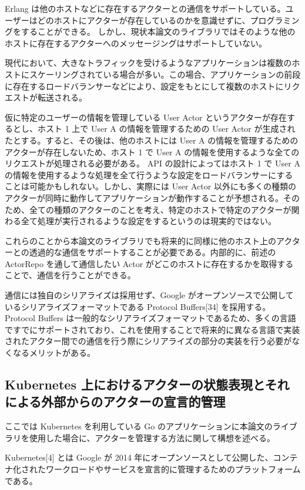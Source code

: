 Erlang
は他のホストなどに存在するアクターとの通信をサポートしている。ユーザーはどのホストにアクターが存在しているのかを意識せずに、プログラミングをすることができる。
しかし、現状本論文のライブラリではそのような他のホストに存在するアクターへのメッセージングはサポートしていない。

現代において、大きなトラフィックを受けるようなアプリケーションは複数のホストにスケーリングされている場合が多い。この場合、アプリケーションの前段に存在するロードバランサーなどにより、設定をもとにして複数のホストにリクエストが転送される。

仮に特定のユーザーの情報を管理している User Actor
というアクターが存在するとし、ホスト 1 上で User A
の情報を管理するための User Actor
が生成されたとする。すると、その後は、他のホストには User A
の情報を管理するためのアクターが存在しないため、ホスト 1 で User A
の情報を使用するような全てのリクエストが処理される必要がある。 API
の設計によってはホスト 1 で User A
の情報を使用するような処理を全て行うような設定をロードバランサーにすることは可能かもしれない。しかし、実際には
User Actor
以外にも多くの種類のアクターが同時に動作してアプリケーションが動作することが予想される。そのため、全ての種類のアクターのことを考え、特定のホストで特定のアクターが関わる全て処理が実行されるような設定をするというのは現実的ではない。

これらのことから本論文のライブラリでも将来的に同様に他のホスト上のアクターとの透過的な通信をサポートすることが必要である。内部的に、前述の
ActorRepo を通して通信したい Actor
がどこのホストに存在するかを取得することで、通信を行うことができる。

通信には独自のシリアライズは採用せず、Google
がオープンソースで公開しているシリアライズフォーマットである Protocol
Buffers{[}34{]} を採用する。Protocol Buffers
は一般的なシリアライズフォーマットであるため、多くの言語ですでにサポートされており、これを使用することで将来的に異なる言語で実装されたアクター間での通信を行う際にシリアライズの部分の実装を行う必要がなくなるメリットがある。

\subsection{Kubernetes 上におけるアクターの状態表現とそれによる外部からのアクターの宣言的管理}

ここでは Kubernetes を利用している Go
のアプリケーションに本論文のライブラリを使用した場合に、アクターを管理する方法に関して構想を述べる。

Kubernetes{[}4{]} とは Google が 2014
年にオープンソースとして公開した、コンテナ化されたワークロードやサービスを宣言的に管理するためのプラットフォームである。

